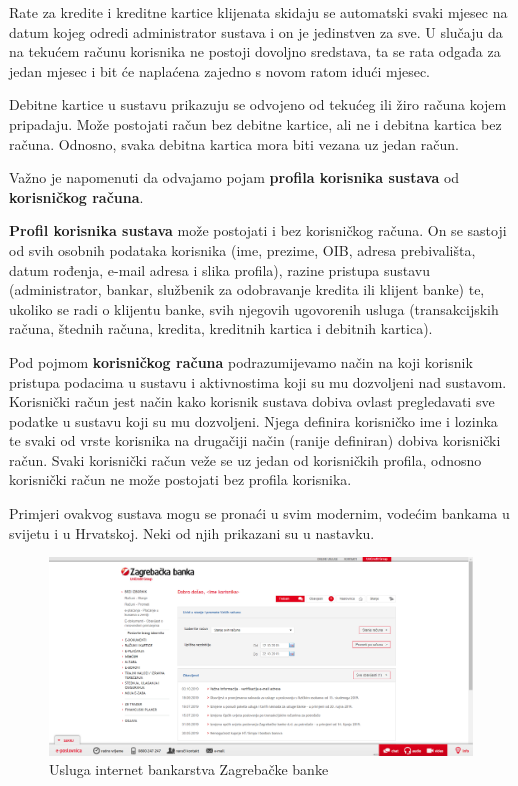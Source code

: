 		Rate za kredite i kreditne kartice klijenata skidaju se automatski svaki mjesec na datum kojeg odredi administrator sustava i on je jedinstven za sve. U slučaju da na tekućem računu korisnika ne postoji dovoljno sredstava, ta se rata odgađa za jedan mjesec i bit će naplaćena zajedno s novom ratom idući mjesec.
		
		Debitne kartice u sustavu prikazuju se odvojeno od tekućeg ili žiro računa kojem pripadaju. Može postojati račun bez debitne kartice, ali ne i debitna kartica bez računa. Odnosno, svaka debitna kartica mora biti vezana uz jedan račun.
		
		Važno je napomenuti da odvajamo pojam \textbf{profila korisnika sustava} od \textbf{korisničkog računa}.
		
		\textbf{Profil korisnika sustava} može postojati i bez korisničkog računa. On se sastoji od svih osobnih podataka korisnika (ime, prezime, OIB, adresa prebivališta, datum rođenja, e-mail adresa i slika profila), razine pristupa sustavu (administrator, bankar, službenik za odobravanje kredita ili klijent banke) te, ukoliko se radi o klijentu banke, svih njegovih ugovorenih usluga (transakcijskih računa, štednih računa, kredita, kreditnih kartica i debitnih kartica).
		
		Pod pojmom \textbf{korisničkog računa} podrazumijevamo način na koji korisnik pristupa podacima u sustavu i aktivnostima koji su mu dozvoljeni nad sustavom. Korisnički račun jest način kako korisnik sustava dobiva ovlast pregledavati sve podatke u sustavu koji su mu dozvoljeni. Njega definira korisničko ime i lozinka te svaki od vrste korisnika na drugačiji način (ranije definiran) dobiva korisnički račun. Svaki korisnički račun veže se uz jedan od korisničkih profila, odnosno korisnički račun ne može postojati bez profila korisnika.
		
		Primjeri ovakvog sustava mogu se pronaći u svim modernim, vodećim bankama u svijetu i u Hrvatskoj. Neki od njih prikazani su u nastavku.
		
		\begin{figure}[H]
			\includegraphics[scale=0.4]{slike/ezaba.PNG}
			\centering
			\caption{Usluga internet bankarstva Zagrebačke banke}
			\label{fig:ezaba}
		\end{figure}
	
